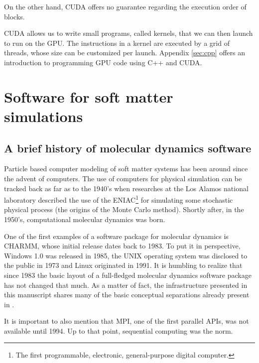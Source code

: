 \documentclass[ twoside,openright,titlepage,numbers=noenddot,%
headinclude,footinclude,cleardoublepage=empty,abstract=on,
BCOR=5mm,paper=a4,fontsize=11pt, dvipsnames
]{scrreprt}
\newcommand{\gpu}{\gls{GPU}\xspace}
\begin{document}
On the other hand, CUDA offers no guarantee regarding the execution order of blocks.

CUDA allows us to write small programs, called kernels, that we can then launch to run on the \gpu. The instructions in a kernel are executed by a grid of threads, whose size can be customized per launch. Appendix \ref{sec:cpp} offers an introduction to programming \gpu code using C++ and CUDA.


\section{Software for soft matter simulations}

\subsection*{A brief history of molecular dynamics software}
Particle based computer modeling of soft matter systems has been around since the advent of computers. The use of computers for physical simulation can be tracked back as far as to the 1940's when researches at the Los Alamos national laboratory described the use of the ENIAC\footnote{The first programmable, electronic, general-purpose digital computer.} for simulating some stochastic physical process\cite{Hurd1985} (the origins of the Monte Carlo method\cite{Johansen2010}). Shortly after, in the 1950's, computational molecular dynamics was born\cite{DeTullio2016}.

One of the first examples of a software package for molecular dynamics is CHARMM, whose initial release dates back to 1983\cite{Brooks1983}. To put it in perspective, Windows 1.0 was released in 1985, the UNIX operating system was disclosed to the public in 1973 and Linux originated in 1991. It is humbling to realize that since 1983 the basic layout of a full-fledged molecular dynamics software package has not changed that much. As a matter of fact, the infrastructure presented in this manuscript shares many of the basic conceptual separations already present in \cite{Brooks1983}.

It is important to also mention that MPI, one of the first parallel \glspl{API}, was not available until 1994. Up to that point, sequential computing was the norm.
\end{document}
